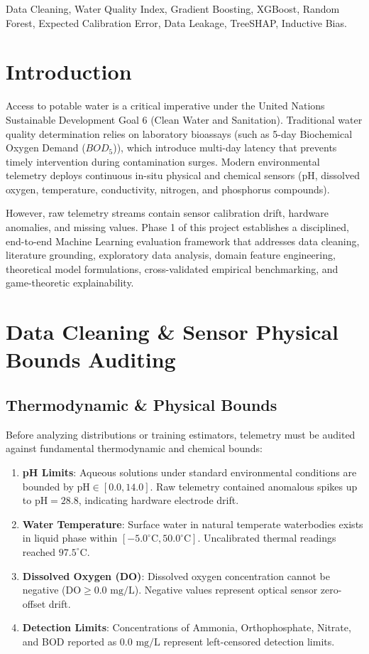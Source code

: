 \documentclass[conference]{IEEEtran}
\begin{document}
\begin{IEEEkeywords}
Data Cleaning, Water Quality Index, Gradient Boosting, XGBoost, Random Forest, Expected Calibration Error, Data Leakage, TreeSHAP, Inductive Bias.
\end{IEEEkeywords}

\section{Introduction}
Access to potable water is a critical imperative under the United Nations Sustainable Development Goal 6 (Clean Water and Sanitation). Traditional water quality determination relies on laboratory bioassays (such as 5-day Biochemical Oxygen Demand ($BOD_5$)), which introduce multi-day latency that prevents timely intervention during contamination surges. Modern environmental telemetry deploys continuous in-situ physical and chemical sensors (pH, dissolved oxygen, temperature, conductivity, nitrogen, and phosphorus compounds).

However, raw telemetry streams contain sensor calibration drift, hardware anomalies, and missing values. Phase 1 of this project establishes a disciplined, end-to-end Machine Learning evaluation framework that addresses data cleaning, literature grounding, exploratory data analysis, domain feature engineering, theoretical model formulations, cross-validated empirical benchmarking, and game-theoretic explainability.

\section{Data Cleaning \& Sensor Physical Bounds Auditing}
\subsection{Thermodynamic & Physical Bounds}
Before analyzing distributions or training estimators, telemetry must be audited against fundamental thermodynamic and chemical bounds:
\begin{enumerate}
    \item \textbf{pH Limits}: Aqueous solutions under standard environmental conditions are bounded by $\text{pH} \in [0.0, 14.0]$. Raw telemetry contained anomalous spikes up to $\text{pH} = 28.8$, indicating hardware electrode drift.
    \item \textbf{Water Temperature}: Surface water in natural temperate waterbodies exists in liquid phase within $[-5.0^\circ\text{C}, 50.0^\circ\text{C}]$. Uncalibrated thermal readings reached $97.5^\circ\text{C}$.
    \item \textbf{Dissolved Oxygen (DO)}: Dissolved oxygen concentration cannot be negative ($\text{DO} \ge 0.0\text{ mg/L}$). Negative values represent optical sensor zero-offset drift.
    \item \textbf{Detection Limits}: Concentrations of Ammonia, Orthophosphate, Nitrate, and BOD reported as $0.0\text{ mg/L}$ represent left-censored detection limits.
\end{enumerate}
\end{document}
